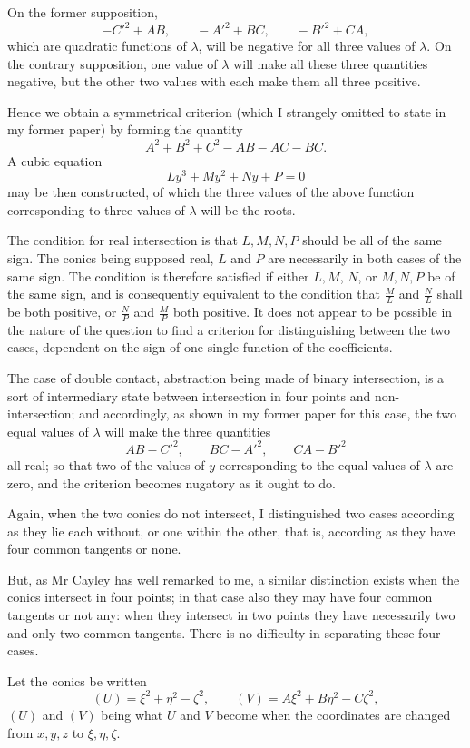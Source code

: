 \documentclass[11pt]{article}
\newcommand{\sourcepage}[1]{\marginpar{\scriptsize p.~#1}}
\begin{document}
{{On the former supposition,
\[
 -C'^2+AB,
 \qquad -A'^2+BC,
 \qquad -B'^2+CA,
\]
which are quadratic functions of $\lambda$, will be negative for all three values of $\lambda$. On the contrary supposition, one value of $\lambda$ will make all these three quantities negative, but the other two values with each make them all three positive.

Hence we obtain a symmetrical criterion (which I strangely omitted to state in my former paper) by forming the quantity
\[
 A^2+B^2+C^2-AB-AC-BC.
\]
A cubic equation
\[
 Ly^3+My^2+Ny+P=0
\]
may be then constructed, of which the three values of the above function corresponding to three values of $\lambda$ will be the roots.

The condition for real intersection is that $L,M,N,P$ should be all of the same sign. The conics being supposed real, $L$ and $P$ are necessarily in both cases of the same sign. The condition is therefore satisfied if either $L,M$, \sourcepage{163} $N$, or $M,N,P$ be of the same sign, and is consequently equivalent to the condition that $\frac ML$ and $\frac NL$ shall be both positive, or $\frac NP$ and $\frac MP$ both positive. It does not appear to be possible in the nature of the question to find a criterion for distinguishing between the two cases, dependent on the sign of one single function of the coefficients.

The case of double contact, abstraction being made of binary intersection, is a sort of intermediary state between intersection in four points and non-intersection; and accordingly, as shown in my former paper for this case, the two equal values of $\lambda$ will make the three quantities
\[
 AB-C'^2,\qquad BC-A'^2,\qquad CA-B'^2
\]
all real; so that two of the values of $y$ corresponding to the equal values of $\lambda$ are zero, and the criterion becomes nugatory as it ought to do.

Again, when the two conics do not intersect, I distinguished two cases according as they lie each without, or one within the other, that is, according as they have four common tangents or none.

But, as Mr Cayley has well remarked to me, a similar distinction exists when the conics intersect in four points; in that case also they may have four common tangents or not any: when they intersect in two points they have necessarily two and only two common tangents. There is no difficulty in separating these four cases.

Let the conics be written
\[
 (U)=\xi^2+\eta^2-\zeta^2,
 \qquad
 (V)=A\xi^2+B\eta^2-C\zeta^2,
\]
$(U)$ and $(V)$ being what $U$ and $V$ become when the coordinates are changed from $x,y,z$ to $\xi,\eta,\zeta$.

}}
\end{document}
